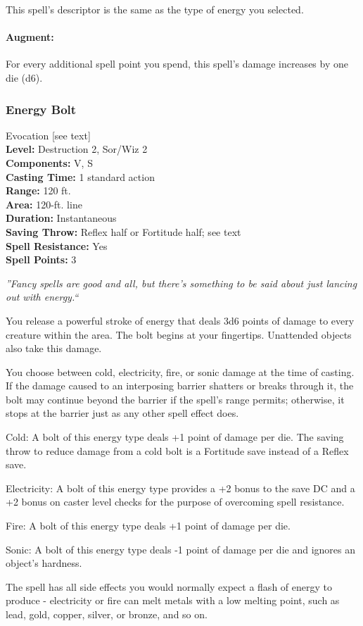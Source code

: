 This spell's descriptor is the same as the type of energy you selected. 

\paragraph{Augment:} For every additional spell point you spend, this spell's damage increases by one die (d6).

\subsubsection{Energy Bolt}
\label{Spell:EnergyBolt}
Evocation [see text]
\\ \textbf{Level:} Destruction 2, Sor/Wiz 2
\\ \textbf{Components:} V, S
\\ \textbf{Casting Time:} 1 standard action
\\ \textbf{Range:} 120 ft.
\\ \textbf{Area:} 120-ft. line
\\ \textbf{Duration:} Instantaneous
\\ \textbf{Saving Throw:} Reflex half or Fortitude half; see text
\\ \textbf{Spell Resistance:} Yes
\\ \textbf{Spell Points:} 3

\emph{''Fancy spells are good and all, but there's something to be said about just lancing out with energy.``}

You release a powerful stroke of energy that deals 3d6 points of damage to every creature within the area. The bolt begins at your fingertips.
Unattended objects also take this damage.

You choose between cold, electricity, fire, or sonic damage at the time of casting.
If the damage caused to an interposing barrier shatters or breaks through it, the bolt may continue beyond the barrier if the spell's range permits; otherwise, it stops at the barrier just as any other spell effect does.

\begin{list}{}{\leftmargin=1em}
 \item Cold: A bolt of this energy type deals +1 point of damage per die. 
 The saving throw to reduce damage from a cold bolt is a Fortitude save instead of a Reflex save.
 \item Electricity: A bolt of this energy type provides a +2 bonus to the save DC
 and a +2 bonus on caster level checks for the purpose of overcoming spell resistance.
 \item Fire: A bolt of this energy type deals +1 point of damage per die.
 \item Sonic: A bolt of this energy type deals -1 point of damage per die and ignores an object's hardness.
\end{list}
The spell has all side effects you would normally expect a flash of energy to produce - electricity or fire can melt metals with a low melting point, such as lead, gold, copper, silver, or bronze, and so on.

